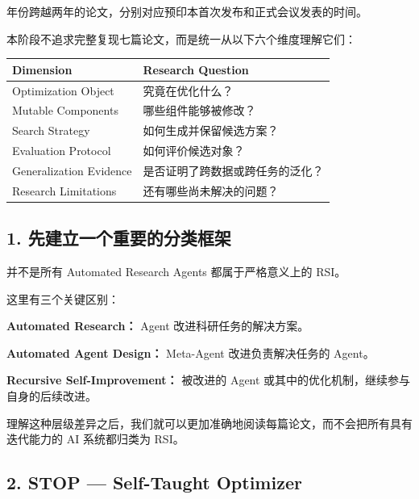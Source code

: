 年份跨越两年的论文，分别对应预印本首次发布和正式会议发表的时间。

本阶段不追求完整复现七篇论文，而是统一从以下六个维度理解它们：

\begin{readertable}
\begin{longtable}[]{@{}
  >{\raggedright\arraybackslash}p{}
  >{\raggedright\arraybackslash}p{}@{}}
\toprule
Dimension & Research Question \\
\midrule
\endhead
Optimization Object & 究竟在优化什么？ \\
Mutable Components & 哪些组件能够被修改？ \\
Search Strategy & 如何生成并保留候选方案？ \\
Evaluation Protocol & 如何评价候选对象？ \\
Generalization Evidence & 是否证明了跨数据或跨任务的泛化？ \\
Research Limitations & 还有哪些尚未解决的问题？ \\
\bottomrule
\end{longtable}
\end{readertable}

\hypertarget{part-3-44-0001-ux5148ux5efaux7acbux4e00ux4e2aux91cdux8981ux7684ux5206ux7c7bux6846ux67b6}{%
\subsection{1. 先建立一个重要的分类框架}\label{part-3-44-0001-ux5148ux5efaux7acbux4e00ux4e2aux91cdux8981ux7684ux5206ux7c7bux6846ux67b6}}

并不是所有 Automated Research Agents 都属于严格意义上的 RSI。


这里有三个关键区别：

\textbf{Automated Research：} Agent 改进科研任务的解决方案。

\textbf{Automated Agent Design：} Meta-Agent 改进负责解决任务的 Agent。

\textbf{Recursive Self-Improvement：} 被改进的 Agent 或其中的优化机制，继续参与自身的后续改进。

理解这种层级差异之后，我们就可以更加准确地阅读每篇论文，而不会把所有具有迭代能力的 AI 系统都归类为 RSI。

\hypertarget{part-3-44-0001-stop-self-taught-optimizer}{%
\subsection{2. STOP --- Self-Taught Optimizer}\label{part-3-44-0001-stop-self-taught-optimizer}}

